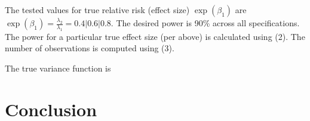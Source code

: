 \documentclass{article}
\begin{document}
The tested values for true relative risk (effect size) $\exp{(\beta_1)}$ are $\exp{(\beta_1)} = \frac{\lambda_2}{\lambda_1}
= 0.4 | 0.6 | 0.8$. The desired power is 90\% across all specifications. 
The power for a particular true effect size (per above) is calculated using (2). 
The number of observations is computed using (3).

The true variance function is 

\section{Conclusion}

\printbibliography[heading=bibnumbered]
\end{document}

